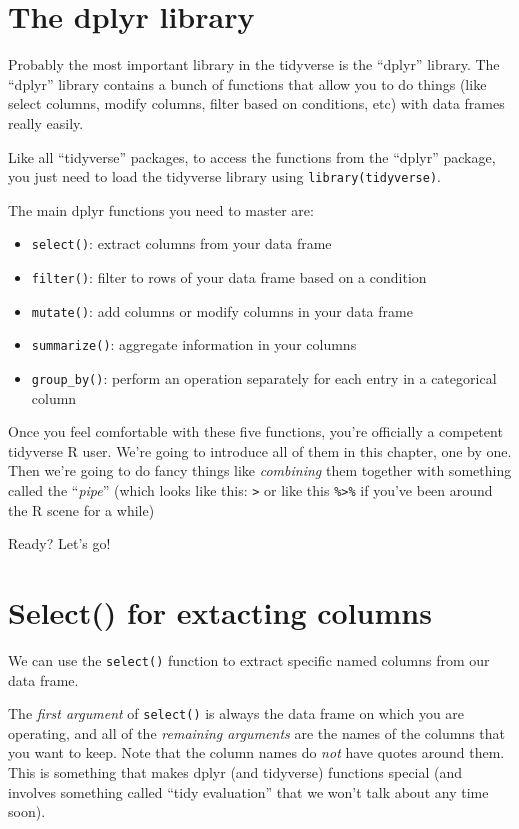 \documentclass[
  letterpaper,
  DIV=11,
  numbers=noendperiod]{scrreprt}
\begin{document}
\section{The dplyr library}\label{the-dplyr-library}

Probably the most important library in the tidyverse is the ``dplyr''
library. The ``dplyr'' library contains a bunch of functions that allow
you to do things (like select columns, modify columns, filter based on
conditions, etc) with data frames really easily.

Like all ``tidyverse'' packages, to access the functions from the
``dplyr'' package, you just need to load the tidyverse library using
\texttt{library(tidyverse)}.

The main dplyr functions you need to master are:

\begin{itemize}
\item
  \texttt{select()}: extract columns from your data frame
\item
  \texttt{filter()}: filter to rows of your data frame based on a
  condition
\item
  \texttt{mutate()}: add columns or modify columns in your data frame
\item
  \texttt{summarize()}: aggregate information in your columns
\item
  \texttt{group\_by()}: perform an operation separately for each entry
  in a categorical column
\end{itemize}

Once you feel comfortable with these five functions, you're officially a
competent tidyverse R user. We're going to introduce all of them in this
chapter, one by one. Then we're going to do fancy things like
\emph{combining} them together with something called the ``\emph{pipe}''
(which looks like this: \texttt{\textbar{}\textgreater{}} or like this
\texttt{\%\textgreater{}\%} if you've been around the R scene for a
while)

Ready? Let's go!

\section{Select() for extacting
columns}\label{select-for-extacting-columns}

We can use the \texttt{select()} function to extract specific named
columns from our data frame.

The \emph{first argument} of \texttt{select()} is always the data frame
on which you are operating, and all of the \emph{remaining arguments}
are the names of the columns that you want to keep. Note that the column
names do \emph{not} have quotes around them. This is something that
makes dplyr (and tidyverse) functions special (and involves something
called ``tidy evaluation'' that we won't talk about any time soon).
\end{document}
